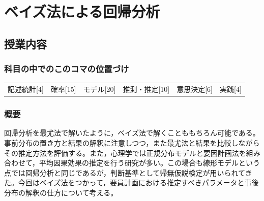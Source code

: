 \section{ベイズ法による回帰分析}
\label{lesson28}

\subsection{授業内容}
\subsubsection{科目の中でのこのコマの位置づけ}
\begin{tabular}[t]{cccccc}
    記述統計[4] & 確率[15] & モデル[20] & 推測・推定[10] & 意思決定[6] & 実践[4]
\end{tabular}
\subsubsection{概要}
回帰分析を最尤法で解いたように，ベイズ法で解くことももちろん可能である。事前分布の置き方と結果の解釈に注意しつつ，また最尤法と結果を比較しながらその推定方法を評価する。また，心理学では正規分布モデルと要因計画法を組み合わせて，平均因果効果の推定を行う研究が多い。この場合も線形モデルという点では回帰分析と同じであるが，判断基準として帰無仮説検定が用いられてきた。今回はベイズ法をつかって，要員計画における推定すべきパラメータと事後分布の解釈の仕方について考える。
